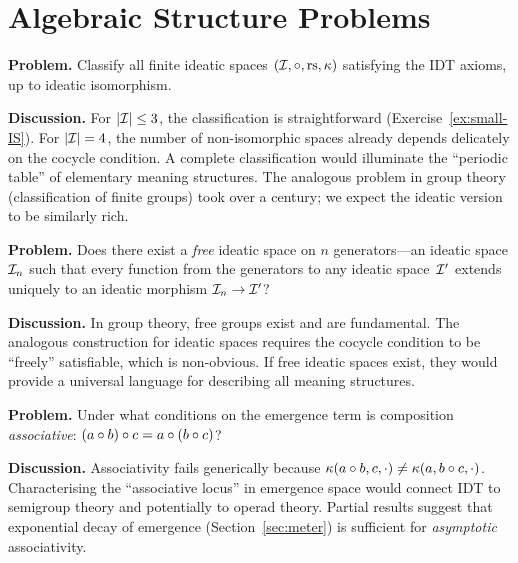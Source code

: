 \section{Algebraic Structure Problems}
\label{sec:open-algebraic}

\begin{game}
\label{op:classification}
\textbf{Problem.}  Classify all finite ideatic spaces
$(\mathcal{I}, \circ, \mathrm{rs}, \kappa)$ satisfying the IDT axioms, up to
ideatic isomorphism.

\textbf{Discussion.}  For $|\mathcal{I}| \le 3$, the classification is
straightforward (Exercise~\ref{ex:small-IS}).  For $|\mathcal{I}| = 4$,
the number of non-isomorphic spaces already depends delicately
on the cocycle condition.  A complete classification would
illuminate the ``periodic table'' of elementary meaning structures.
The analogous problem in group theory (classification of finite
groups) took over a century; we expect the ideatic version to be
similarly rich.
\end{game}

\begin{game}
\label{op:free}
\textbf{Problem.}  Does there exist a \emph{free} ideatic space
on $n$ generators---an ideatic space $\mathcal{I}_n$ such that every
function from the generators to any ideatic space~$\mathcal{I}'$ extends
uniquely to an ideatic morphism $\mathcal{I}_n \to \mathcal{I}'$?

\textbf{Discussion.}  In group theory, free groups exist and are
fundamental.  The analogous construction for ideatic spaces
requires the cocycle condition to be ``freely'' satisfiable, which
is non-obvious.  If free ideatic spaces exist, they would provide
a universal language for describing all meaning structures.
\end{game}

\begin{game}
\label{op:associativity}
\textbf{Problem.}  Under what conditions on the emergence term is
composition \emph{associative}: $(a \circ b) \circ c = a
\circ (b \circ c)$?

\textbf{Discussion.}  Associativity fails generically because
$\kappa(a \circ b, c, \cdot) \neq \kappa(a, b \circ c,
\cdot)$.  Characterising the ``associative locus'' in emergence
space would connect IDT to semigroup theory and potentially to
operad theory.  Partial results suggest that exponential decay
of emergence (Section~\ref{sec:meter}) is sufficient for
\emph{asymptotic} associativity.
\end{game}

